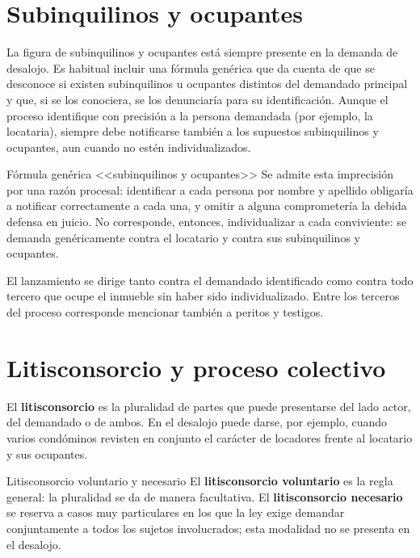 \documentclass[12pt,oneside]{book}
\begin{document}
\section{Subinquilinos y ocupantes}

La figura de subinquilinos y ocupantes está siempre presente en la demanda de desalojo. Es habitual incluir una fórmula genérica que da cuenta de que se desconoce si existen subinquilinos u ocupantes distintos del demandado principal y que, si se los conociera, se los denunciaría para su identificación. Aunque el proceso identifique con precisión a la persona demandada (por ejemplo, la locataria), siempre debe notificarse también a los supuestos subinquilinos y ocupantes, aun cuando no estén individualizados.

\begin{definition}{Fórmula genérica <<subinquilinos y ocupantes>>}
Se admite esta imprecisión por una razón procesal: identificar a cada persona por nombre y apellido obligaría a notificar correctamente a cada una, y omitir a alguna comprometería la debida defensa en juicio. No corresponde, entonces, individualizar a cada conviviente: se demanda genéricamente contra el locatario y contra sus subinquilinos y ocupantes.
\end{definition}

El lanzamiento se dirige tanto contra el demandado identificado como contra todo tercero que ocupe el inmueble sin haber sido individualizado. Entre los terceros del proceso corresponde mencionar también a peritos y testigos.

\section{Litisconsorcio y proceso colectivo}

El \textbf{litisconsorcio} es la pluralidad de partes que puede presentarse del lado actor, del demandado o de ambos. En el desalojo puede darse, por ejemplo, cuando varios condóminos revisten en conjunto el carácter de locadores frente al locatario y sus ocupantes.

\begin{definition}{Litisconsorcio voluntario y necesario}
El \textbf{litisconsorcio voluntario} es la regla general: la pluralidad se da de manera facultativa. El \textbf{litisconsorcio necesario} se reserva a casos muy particulares en los que la ley exige demandar conjuntamente a todos los sujetos involucrados; esta modalidad no se presenta en el desalojo.
\end{definition}
\end{document}
